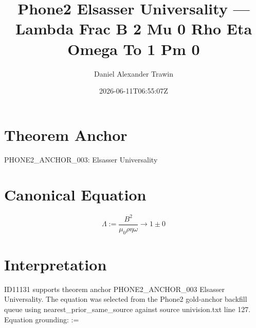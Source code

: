 \documentclass[11pt]{article}
\title{Phone2 Elsasser Universality — Lambda Frac B 2 Mu 0 Rho Eta Omega To 1 Pm 0}
\author{Daniel Alexander Trawin}
\date{2026-06-11T06:55:07Z}
\begin{document}
\maketitle
\section*{Theorem Anchor}
PHONE2_ANCHOR_003: Elsasser Universality
\section*{Canonical Equation}
\[
\Lambda := \frac{B^2}{\mu_0 \rho \eta \omega} \to 1 \pm 0
\]
\section*{Interpretation}
ID11131 supports theorem anchor PHONE2_ANCHOR_003 Elsasser Universality. The equation was selected from the Phone2 gold-anchor backfill queue using nearest_prior_same_source against source univision.txt line 127. Equation grounding: \Lambda :=   
\end{document}
